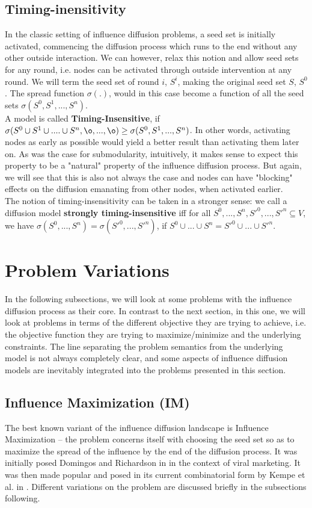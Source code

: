 \documentclass[twocolumn, 10pt]{article}
\begin{document}
\subsection{Timing-inensitivity}
In the classic setting of influence diffusion problems, a seed set is initially activated, commencing the diffusion process which runs to the end without any other outside interaction. We can however, relax this notion and allow seed sets for any round, i.e. nodes can be activated through outside intervention at any round. We will term the seed set of round $i$, $S^i$, making the original seed set $S$, $S^0$. The spread function $\sigma(.)$, would in this case become a function of all the seed sets $\sigma(S^0, S^1, ..., S^n)$. \\
A model is called \textbf{Timing-Insensitive}, if $\sigma(S^0 \cup S^1 \cup .... \cup S^n, \o, ..., \o) \geq \sigma(S^0, S^1, ..., S^n)$. In other words, activating nodes as early as possible would yield a better result than activating them later on. As was the case for submodularity, intuitively, it makes sense to expect this property to be a "natural" property of the influence diffusion process. But again, we will see that this is also not always the case and nodes can have "blocking" effects on the diffusion emanating from other nodes, when activated earlier. \\
The notion of timing-insensitivity can be taken in a stronger sense: we call a diffusion model \textbf{strongly timing-insensitive} iff for all $S^0, ..., S^n, S'^0, ..., S'^n \subseteq V$, we have $\sigma(S^0,..., S^n) = \sigma(S'^0,..., S'^n)$, if $S^0 \cup ... \cup S^n = S'^0 \cup ... \cup S'^n$.

\section{Problem Variations}
In the following subsections, we will look at some problems with the influence diffusion process as their core. In contrast to the next section, in this one, we will look at problems in terms of the different objective they are trying to achieve, i.e. the objective function they are trying to maximize/minimize and the underlying constraints. The line separating the problem semantics from the underlying model is not always completely clear, and some aspects of influence diffusion models are inevitably integrated into the problems presented in this section. \\
\subsection{Influence Maximization (IM)}
The best known variant of the influence diffusion landscape is Influence Maximization -- the problem concerns itself with choosing the seed set so as to maximize the spread of the influence by the end of the diffusion process. It was initially posed Domingos and Richardson in \cite{dom} in the context of viral marketing. It was then made popular and posed in its current combinatorial form by Kempe et al. in \cite{kempe}. Different variations on the problem are discussed briefly in the subsections following.
\end{document}
